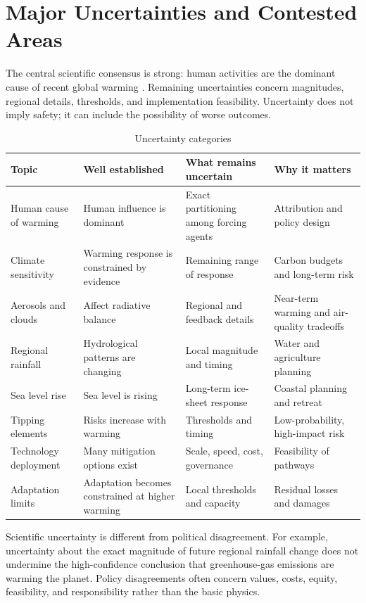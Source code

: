 \documentclass[12pt]{article}
\begin{document}
\section{Major Uncertainties and Contested Areas}

The central scientific consensus is strong: human activities are the dominant cause of recent global warming \cite{ref1,ref5}. Remaining uncertainties concern magnitudes, regional details, thresholds, and implementation feasibility. Uncertainty does not imply safety; it can include the possibility of worse outcomes.

\begin{table}[htbp]
\centering
\caption{Uncertainty categories}
\begin{tabularx}{\textwidth}{p{3cm}Y Y Y}
\toprule
Topic & Well established & What remains uncertain & Why it matters \\
\midrule
Human cause of warming & Human influence is dominant & Exact partitioning among forcing agents & Attribution and policy design \\
Climate sensitivity & Warming response is constrained by evidence & Remaining range of response & Carbon budgets and long-term risk \\
Aerosols and clouds & Affect radiative balance & Regional and feedback details & Near-term warming and air-quality tradeoffs \\
Regional rainfall & Hydrological patterns are changing & Local magnitude and timing & Water and agriculture planning \\
Sea level rise & Sea level is rising & Long-term ice-sheet response & Coastal planning and retreat \\
Tipping elements & Risks increase with warming & Thresholds and timing & Low-probability, high-impact risk \\
Technology deployment & Many mitigation options exist & Scale, speed, cost, governance & Feasibility of pathways \\
Adaptation limits & Adaptation becomes constrained at higher warming & Local thresholds and capacity & Residual losses and damages \\
\bottomrule
\end{tabularx}
\end{table}

Scientific uncertainty is different from political disagreement. For example, uncertainty about the exact magnitude of future regional rainfall change does not undermine the high-confidence conclusion that greenhouse-gas emissions are warming the planet. Policy disagreements often concern values, costs, equity, feasibility, and responsibility rather than the basic physics.
\end{document}
